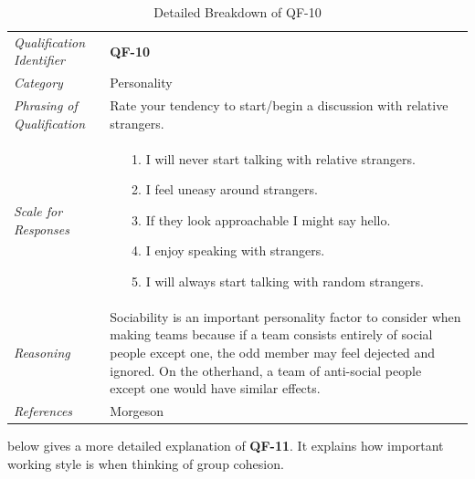 \documentclass[12pt,letterpaper]{article}
\begin{document}
\begin{table}[H]
	\caption{Detailed Breakdown of QF-10}
	\begin{tabu} to 
		\toprule
		Qualification Identifier & {\bf QF-10}\\
		Category & Personality \\
		Phrasing of Qualification & Rate your tendency to start/begin a discussion with relative strangers. \\
		Scale for Responses &
		\begin{minipage}[t]{\linewidth}
			\begin{enumerate}
				\item[1.] I will never start talking with relative strangers.
				\item[2.] I feel uneasy around strangers.
				\item[3.] If they look approachable I might say hello.
				\item[4.] I enjoy speaking with strangers.
				\item[5.] I will always start talking with random strangers.
			\end{enumerate}
		\end{minipage}\\
		Reasoning & Sociability is an important personality factor to consider when making teams because if a team consists entirely of social people except one, the odd member may feel dejected and ignored. On the otherhand, a team of anti-social people except one would have similar effects.\\
		References & Morgeson\cite{morgeson}\\
		\toprule
	\end{tabu}
\end{table}

\newpage{}

 below gives a more detailed explanation of {\bf QF-11}. It explains how important working style is when thinking of group cohesion.
\end{document}
